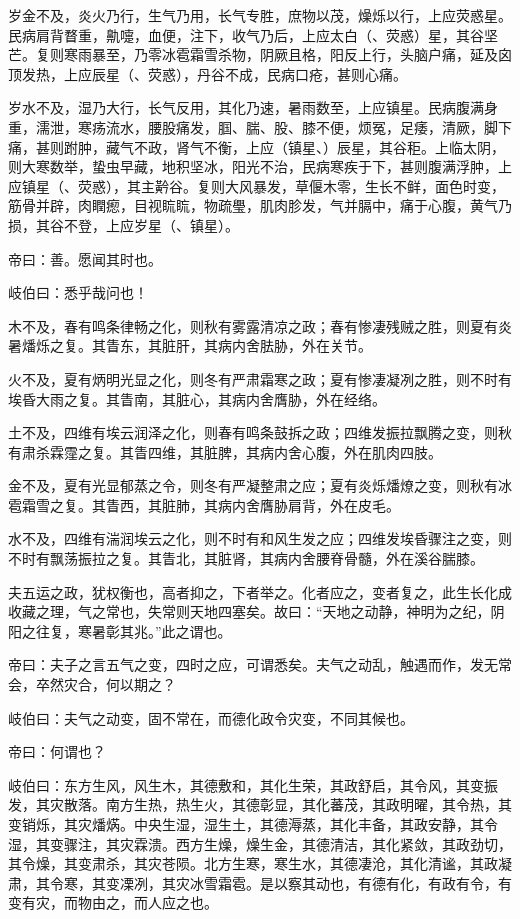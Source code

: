 \documentclass{article}%
\begin{document}
岁金不及，炎火乃行，生气乃用，长气专胜，庶物以茂，燥烁以行，上应荧惑星。民病肩背瞀重，鼽嚏，血便，注下，收气乃后，上应太白（、荧惑）星，其谷坚芒。复则寒雨暴至，乃零冰雹霜雪杀物，阴厥且格，阳反上行，头脑户痛，延及囟顶发热，上应辰星（、荧惑），丹谷不成，民病口疮，甚则心痛。

岁水不及，湿乃大行，长气反用，其化乃速，暑雨数至，上应镇星。民病腹满身重，濡泄，寒疡流水，腰股痛发，腘、腨、股、膝不便，烦冤，足痿，清厥，脚下痛，甚则跗肿，藏气不政，肾气不衡，上应（镇星、）辰星，其谷秬。上临太阴，则大寒数举，蛰虫早藏，地积坚冰，阳光不治，民病寒疾于下，甚则腹满浮肿，上应镇星（、荧惑），其主黅谷。复则大风暴发，草偃木零，生长不鲜，面色时变，筋骨并辟，肉瞤瘛，目视䀮䀮，物疏璺，肌肉胗发，气并膈中，痛于心腹，黄气乃损，其谷不登，上应岁星（、镇星）。

帝曰：善。愿闻其时也。

岐伯曰：悉乎哉问也！

木不及，春有鸣条律畅之化，则秋有雾露清凉之政；春有惨凄残贼之胜，则夏有炎暑燔烁之复。其眚东，其脏肝，其病内舍胠胁，外在关节。

火不及，夏有炳明光显之化，则冬有严肃霜寒之政；夏有惨凄凝冽之胜，则不时有埃昏大雨之复。其眚南，其脏心，其病内舍膺胁，外在经络。

土不及，四维有埃云润泽之化，则春有鸣条鼓拆之政；四维发振拉飘腾之变，则秋有肃杀霖霪之复。其眚四维，其脏脾，其病内舍心腹，外在肌肉四肢。

金不及，夏有光显郁蒸之令，则冬有严凝整肃之应；夏有炎烁燔燎之变，则秋有冰雹霜雪之复。其眚西，其脏肺，其病内舍膺胁肩背，外在皮毛。

水不及，四维有湍润埃云之化，则不时有和风生发之应；四维发埃昏骤注之变，则不时有飘荡振拉之复。其眚北，其脏肾，其病内舍腰脊骨髓，外在溪谷腨膝。

夫五运之政，犹权衡也，高者抑之，下者举之。化者应之，变者复之，此生长化成收藏之理，气之常也，失常则天地四塞矣。故曰：“天地之动静，神明为之纪，阴阳之往复，寒暑彰其兆。”此之谓也。

帝曰：夫子之言五气之变，四时之应，可谓悉矣。夫气之动乱，触遇而作，发无常会，卒然灾合，何以期之？

岐伯曰：夫气之动变，固不常在，而德化政令灾变，不同其候也。

帝曰：何谓也？

岐伯曰：东方生风，风生木，其德敷和，其化生荣，其政舒启，其令风，其变振发，其灾散落。南方生热，热生火，其德彰显，其化蕃茂，其政明曜，其令热，其变销烁，其灾燔焫。中央生湿，湿生土，其德溽蒸，其化丰备，其政安静，其令湿，其变骤注，其灾霖溃。西方生燥，燥生金，其德清洁，其化紧敛，其政劲切，其令燥，其变肃杀，其灾苍陨。北方生寒，寒生水，其德凄沧，其化清谧，其政凝肃，其令寒，其变凓冽，其灾冰雪霜雹。是以察其动也，有德有化，有政有令，有变有灾，而物由之，而人应之也。
\end{document}
